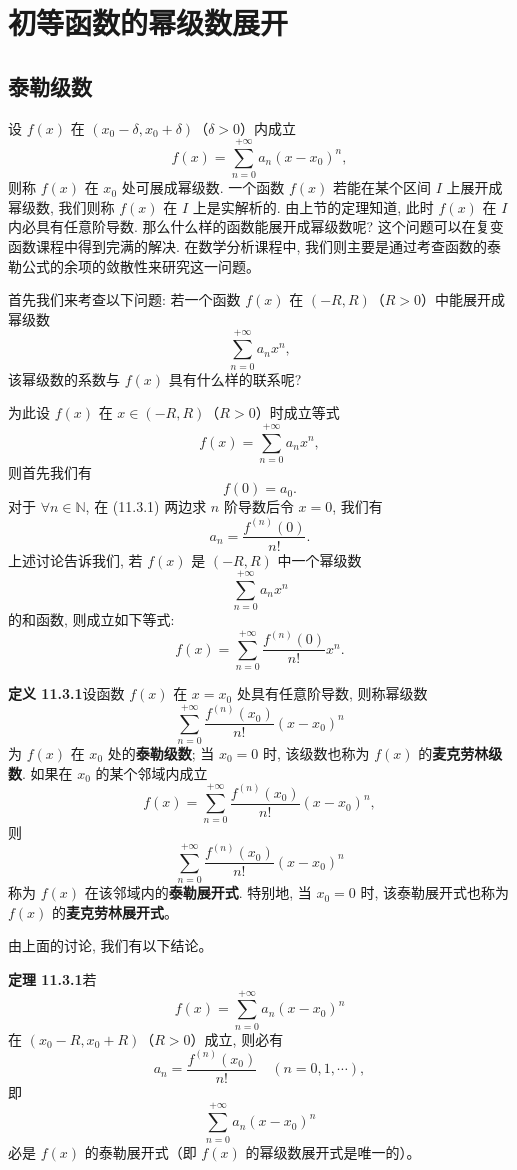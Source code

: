 \documentclass[UTF8,12pt,a4paper,fontset=fandol]{ctexart}
\begin{document}
\section{初等函数的幂级数展开}

\subsection{泰勒级数}

设 $f(x)$ 在 $(x_0-\delta,x_0+\delta)$（$\delta>0$）内成立
\[
  f(x)=\sum_{n=0}^{+\infty}a_n(x-x_0)^n,
\]
则称 $f(x)$ 在 $x_0$ 处可展成幂级数. 一个函数 $f(x)$ 若能在某个区间 $I$ 上展开成幂级数, 我们则称 $f(x)$ 在 $I$ 上是实解析的. 由上节的定理知道, 此时 $f(x)$ 在 $I$ 内必具有任意阶导数. 那么什么样的函数能展开成幂级数呢? 这个问题可以在复变函数课程中得到完满的解决. 在数学分析课程中, 我们则主要是通过考查函数的泰勒公式的余项的敛散性来研究这一问题。

首先我们来考查以下问题: 若一个函数 $f(x)$ 在 $(-R,R)$（$R>0$）中能展开成幂级数
\[
  \sum_{n=0}^{+\infty}a_nx^n,
\]
该幂级数的系数与 $f(x)$ 具有什么样的联系呢?

为此设 $f(x)$ 在 $x\in(-R,R)$（$R>0$）时成立等式
\begin{equation}
  f(x)=\sum_{n=0}^{+\infty}a_nx^n,
  \tag{11.3.1}
\end{equation}
则首先我们有
\[
  f(0)=a_0.
\]
对于 $\forall n\in\mathbb N$, 在 (11.3.1) 两边求 $n$ 阶导数后令 $x=0$, 我们有
\[
  a_n=\frac{f^{(n)}(0)}{n!}.
\]
上述讨论告诉我们, 若 $f(x)$ 是 $(-R,R)$ 中一个幂级数
\[
  \sum_{n=0}^{+\infty}a_nx^n
\]
的和函数, 则成立如下等式:
\[
  f(x)=\sum_{n=0}^{+\infty}\frac{f^{(n)}(0)}{n!}x^n.
\]

\noindent\textbf{定义 11.3.1}\quad 设函数 $f(x)$ 在 $x=x_0$ 处具有任意阶导数, 则称幂级数
\[
  \sum_{n=0}^{+\infty}\frac{f^{(n)}(x_0)}{n!}(x-x_0)^n
\]
为 $f(x)$ 在 $x_0$ 处的\textbf{泰勒级数}; 当 $x_0=0$ 时, 该级数也称为 $f(x)$ 的\textbf{麦克劳林级数}. 如果在 $x_0$ 的某个邻域内成立
\[
  f(x)=\sum_{n=0}^{+\infty}\frac{f^{(n)}(x_0)}{n!}(x-x_0)^n,
\]
则
\[
  \sum_{n=0}^{+\infty}\frac{f^{(n)}(x_0)}{n!}(x-x_0)^n
\]
称为 $f(x)$ 在该邻域内的\textbf{泰勒展开式}. 特别地, 当 $x_0=0$ 时, 该泰勒展开式也称为 $f(x)$ 的\textbf{麦克劳林展开式}。

由上面的讨论, 我们有以下结论。

\noindent\textbf{定理 11.3.1}\quad 若
\[
  f(x)=\sum_{n=0}^{+\infty}a_n(x-x_0)^n
\]
在 $(x_0-R,x_0+R)$（$R>0$）成立, 则必有
\[
  a_n=\frac{f^{(n)}(x_0)}{n!}\quad(n=0,1,\cdots),
\]
即
\[
  \sum_{n=0}^{+\infty}a_n(x-x_0)^n
\]
必是 $f(x)$ 的泰勒展开式（即 $f(x)$ 的幂级数展开式是唯一的）。
\end{document}
